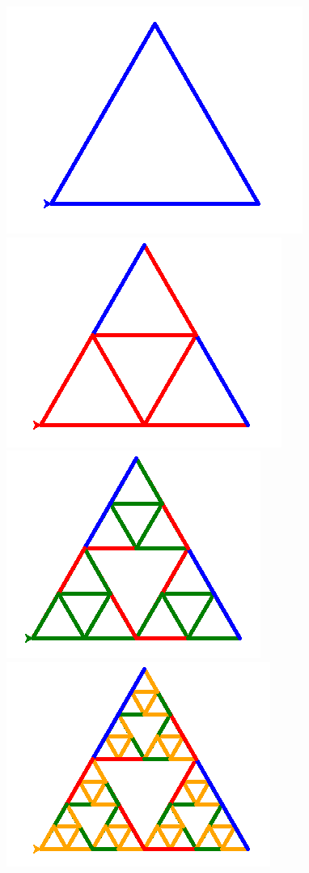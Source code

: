\documentclass[11pt,class=report,crop=false]{standalone}
\begin{document}
\begin{activite}
\begin{center}
\includegraphics[scale=\myscale,scale=0.3]{ecran-tortue-4a}
\includegraphics[scale=\myscale,scale=0.3]{ecran-tortue-4b}
\includegraphics[scale=\myscale,scale=0.3]{ecran-tortue-4c}
\includegraphics[scale=\myscale,scale=0.3]{ecran-tortue-4d}
\end{center}


\end{activite}
\end{document}
